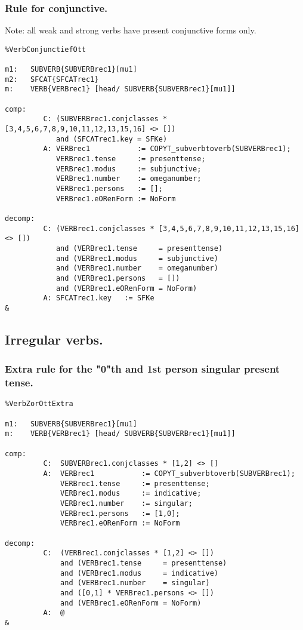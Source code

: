 \subsubsection{Rule for conjunctive.}

Note: all weak and strong verbs have present conjunctive forms only.

\begin{verbatim}
%VerbConjunctiefOtt

m1:   SUBVERB{SUBVERBrec1}[mu1]
m2:   SFCAT{SFCATrec1}
m:    VERB{VERBrec1} [head/ SUBVERB{SUBVERBrec1}[mu1]]

comp:
         C: (SUBVERBrec1.conjclasses * [3,4,5,6,7,8,9,10,11,12,13,15,16] <> [])
            and (SFCATrec1.key = SFKe)
         A: VERBrec1           := COPYT_subverbtoverb(SUBVERBrec1);
            VERBrec1.tense     := presenttense;
            VERBrec1.modus     := subjunctive;
            VERBrec1.number    := omeganumber;
            VERBrec1.persons   := [];
            VERBrec1.eORenForm := NoForm

decomp:
         C: (VERBrec1.conjclasses * [3,4,5,6,7,8,9,10,11,12,13,15,16] <> [])
            and (VERBrec1.tense     = presenttense) 
            and (VERBrec1.modus     = subjunctive)
            and (VERBrec1.number    = omeganumber)
            and (VERBrec1.persons   = [])
            and (VERBrec1.eORenForm = NoForm)
         A: SFCATrec1.key   := SFKe
&
\end{verbatim}
\newpage
\subsection{Irregular verbs.}
\subsubsection{Extra rule for the "0"th and 1st person singular present tense.}
\begin{verbatim}
%VerbZorOttExtra 

m1:   SUBVERB{SUBVERBrec1}[mu1]
m:    VERB{VERBrec1} [head/ SUBVERB{SUBVERBrec1}[mu1]]

comp:
         C:  SUBVERBrec1.conjclasses * [1,2] <> []
         A:  VERBrec1           := COPYT_subverbtoverb(SUBVERBrec1);
             VERBrec1.tense     := presenttense;
             VERBrec1.modus     := indicative;
             VERBrec1.number    := singular;
             VERBrec1.persons   := [1,0];
             VERBrec1.eORenForm := NoForm

decomp:
         C:  (VERBrec1.conjclasses * [1,2] <> [])
             and (VERBrec1.tense     = presenttense)
             and (VERBrec1.modus     = indicative)
             and (VERBrec1.number    = singular)
             and ([0,1] * VERBrec1.persons <> [])
             and (VERBrec1.eORenForm = NoForm)
         A:  @
&
\end{verbatim}
\newpage
